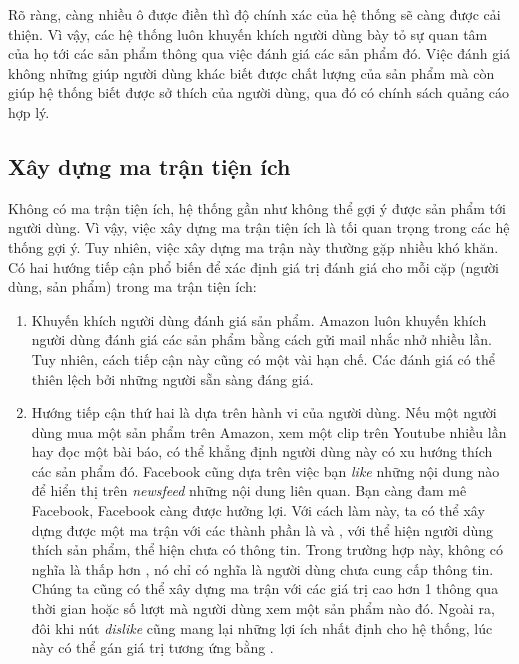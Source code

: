 Rõ ràng, càng nhiều ô được điền thì độ chính xác của hệ thống sẽ càng được cải
thiện. Vì vậy, các hệ thống luôn khuyến khích người dùng {bày tỏ} sự quan tâm
của họ tới các sản phẩm thông qua việc đánh giá các sản phẩm đó. Việc đánh giá
không những giúp người dùng khác biết được chất lượng của sản phẩm mà còn giúp
hệ thống {biết} được sở thích của người dùng, qua đó có chính sách quảng cáo hợp
lý.


\subsection{Xây dựng ma trận tiện ích}

Không có ma trận tiện ích, hệ thống gần như không thể gợi ý được sản phẩm tới
người dùng. Vì vậy, việc xây dựng ma trận tiện ích là tối quan trọng trong các
hệ thống gợi ý. Tuy nhiên, việc xây dựng ma trận này thường gặp nhiều khó khăn.
Có hai hướng tiếp cận phổ biến để xác định giá trị đánh giá cho mỗi cặp (người
dùng, sản phẩm) trong ma trận tiện ích:
\vspace{-0.25cm}
\begin{enumerate}
\item Khuyến khích người dùng đánh giá sản phẩm. Amazon luôn
khuyến khích người dùng đánh giá các sản phẩm bằng cách gửi mail nhắc nhở
nhiều lần. Tuy nhiên, cách tiếp cận này cũng có một vài hạn chế. Các đánh
giá có thể thiên lệch bởi những người sẵn sàng đáng giá.

\item Hướng tiếp cận thứ hai là dựa trên hành vi của người dùng. Nếu một
người dùng mua một sản phẩm trên Amazon, xem một clip trên Youtube
nhiều lần hay đọc một bài báo, có thể khẳng định người dùng
này {có xu hướng} thích các sản phẩm đó. Facebook cũng dựa trên việc
bạn \textit{like} những nội dung nào để hiển thị trên \textit{newsfeed}  những nội dung liên quan. Bạn càng đam mê Facebook, Facebook càng được
hưởng lợi. Với cách làm này, ta có thể xây dựng được một ma
trận với các thành phần là  và , với
 thể hiện người dùng thích sản phẩm,
 thể hiện chưa có thông tin. Trong trường hợp này,
 không có nghĩa là thấp hơn , nó chỉ có
nghĩa là người dùng chưa cung cấp thông tin. Chúng ta cũng có thể xây
dựng ma trận với các giá trị cao hơn 1 thông qua thời gian hoặc số lượt mà
người dùng xem một sản phẩm nào đó. Ngoài ra, đôi khi nút
\textit{dislike}
cũng mang lại những lợi ích nhất định cho hệ thống, lúc này có thể gán giá
trị tương ứng bằng
.
\end{enumerate}


